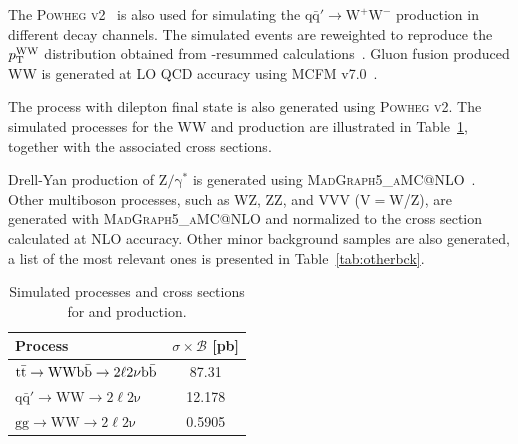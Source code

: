 The \textsc{Powheg v2}~\cite{Melia:2011tj} is also used for simulating the $\mathrm{q\bar{q}' \to W^+W^-}$ production in different decay channels. The simulated events are reweighted to reproduce the $p_\mathrm{T}^\mathrm{WW}$ distribution obtained from \pt-resummed calculations~\cite{Meade:2014fca,Jaiswal:2014yba}. Gluon fusion produced WW is generated at LO QCD accuracy using \textsc{MCFM} v7.0~\cite{Campbell:2013wga}.

The \ttbar process with dilepton final state is also generated using \textsc{Powheg v2}. The simulated processes for the WW and \ttbar production are illustrated in Table~\ref{tab:wwl}, together with the associated cross sections.

Drell-Yan production of $\mathrm{Z/\gamma^{*}}$ is generated using \textsc{MadGraph5\_aMC@NLO}~\cite{Alwall:2014hca}. 
Other multiboson processes, such as WZ, ZZ, and VVV (V$=$W/Z), are generated with \textsc{MadGraph5\_aMC@NLO} and normalized to the cross section calculated at NLO accuracy. Other minor background samples are also generated, a list of the most relevant ones is presented in Table~\ref{tab:otherbck}.

\begin{table}[htb]
\caption{Simulated processes and cross sections for \ttbar and \WW production.}\label{tab:wwl}
\begin{center}
\begin{tabular}{lc}
\toprule
Process & $\sigma\times\mathcal{B}$ [pb] \\
\midrule
$\mathrm{\mathrm{t}\bar{\mathrm{t}}\to WW b\bar{b}\to 2\ell2\nu b\bar{b}}$ & 87.31 \\
$\mathrm{q\bar{q}'\to WW \to 2\ell2\nu}$ & 12.178 \\
$\mathrm{gg\to WW \to 2\ell2\nu}$ & 0.5905 \\
\bottomrule
\end{tabular}
\end{center}
\end{table}

